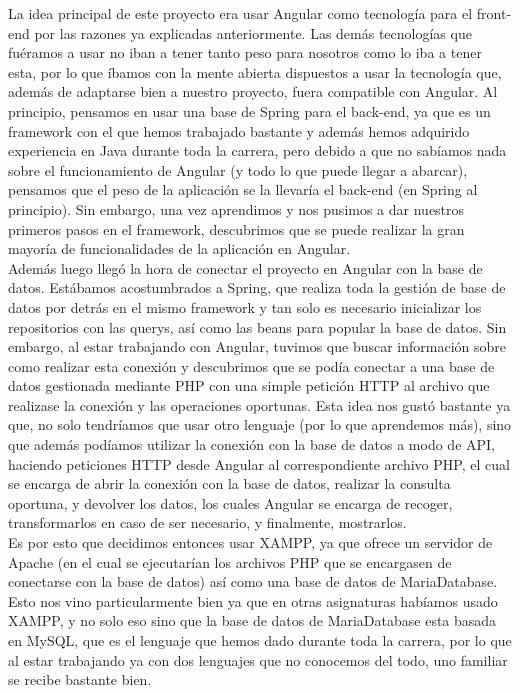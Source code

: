 La idea principal de este proyecto era usar Angular como tecnología para el front-end por las razones ya explicadas anteriormente. Las demás tecnologías que fuéramos a usar no iban a tener tanto peso para nosotros como lo iba a tener esta, por lo que íbamos con la mente abierta dispuestos a usar la tecnología que, además de adaptarse bien a nuestro proyecto, fuera compatible con Angular. Al principio, pensamos en usar una base de Spring para el back-end, ya que es un framework con el que hemos trabajado bastante y además hemos adquirido experiencia en Java durante toda la carrera, pero debido a que no sabíamos nada sobre el funcionamiento de Angular (y todo lo que puede llegar a abarcar), pensamos que el peso de la aplicación se la llevaría el back-end (en Spring al principio). Sin embargo, una vez aprendimos y nos pusimos a dar nuestros primeros pasos en el framework, descubrimos que se puede realizar la gran mayoría de funcionalidades de la aplicación en Angular.\\

Además luego llegó la hora de conectar el proyecto en Angular con la base de datos. Estábamos acostumbrados a Spring, que realiza toda la gestión de base de datos por detrás en el mismo framework y tan solo es necesario inicializar los repositorios con las querys, así como las beans para popular la base de datos. Sin embargo, al estar trabajando con Angular, tuvimos que buscar información sobre como realizar esta conexión y descubrimos que se podía conectar a una base de datos gestionada mediante PHP con una simple petición HTTP al archivo que realizase la conexión y las operaciones oportunas. Esta idea nos gustó bastante ya que, no solo tendríamos que usar otro lenguaje (por lo que aprendemos más), sino que además podíamos utilizar la conexión con la base de datos a modo de API, haciendo peticiones HTTP desde Angular al correspondiente archivo PHP, el cual se encarga de abrir la conexión con la base de datos, realizar la consulta oportuna, y devolver los datos, los cuales Angular se encarga de recoger, transformarlos en caso de ser necesario, y finalmente, mostrarlos.\\

Es por esto que decidimos entonces usar XAMPP, ya que ofrece un servidor de Apache (en el cual se ejecutarían los archivos PHP que se encargasen de conectarse con la base de datos) así como una base de datos de MariaDatabase. Esto nos vino particularmente bien ya que en otras asignaturas habíamos usado XAMPP, y no solo eso sino que la base de datos de MariaDatabase esta basada en MySQL, que es el lenguaje que hemos dado durante toda la carrera, por lo que al estar trabajando ya con dos lenguajes que no conocemos del todo, uno familiar se recibe bastante bien.\\


